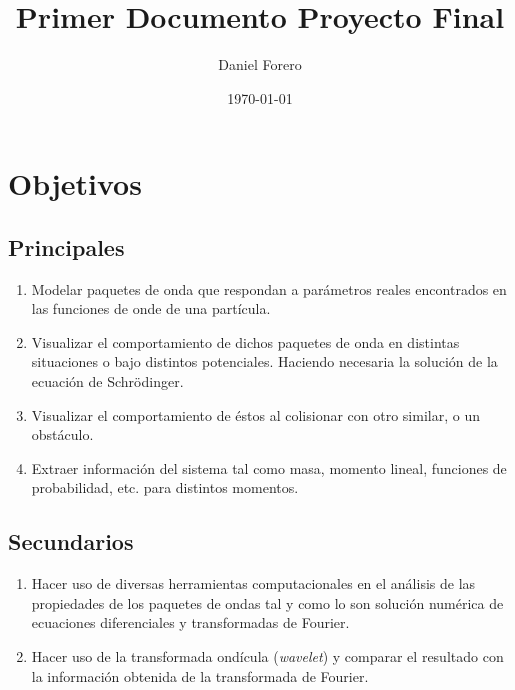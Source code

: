 \documentclass{article}
\title{Primer Documento Proyecto Final}
\author{Daniel Forero}
\date{\today}
\begin{document}
\maketitle
\section{Objetivos}
\subsection{Principales}
\begin{enumerate}
\item Modelar paquetes de onda que respondan a parámetros reales encontrados en las funciones de onde de una partícula.
\item Visualizar el comportamiento de dichos paquetes de onda en distintas situaciones o bajo distintos potenciales. Haciendo necesaria la solución de la ecuación de Schrödinger.
\item Visualizar el comportamiento de éstos al colisionar con otro similar, o un obstáculo.
\item Extraer información del sistema tal como masa, momento lineal, funciones de probabilidad, etc. para distintos momentos.
\end{enumerate}

\subsection{Secundarios}
\begin{enumerate}
	\item Hacer uso de diversas herramientas computacionales en el análisis de las propiedades de los paquetes de ondas tal y como lo son solución numérica de ecuaciones diferenciales y transformadas de Fourier.
	\item Hacer uso de la transformada ondícula (\textit{wavelet}) y comparar el resultado con la información obtenida de la transformada de Fourier.
\end{enumerate}
\end{document}
